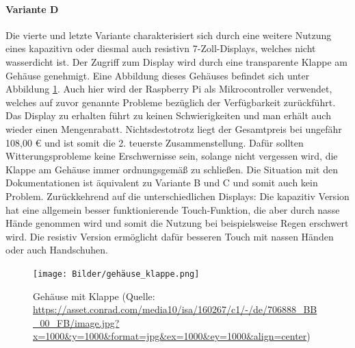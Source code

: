 \paragraph{Variante D}
Die vierte und letzte Variante charakterisiert sich durch eine weitere Nutzung eines \gls{kapazitiv}n oder diesmal auch \gls{resistiv}n 7-Zoll-Displays, welches nicht wasserdicht ist. Der Zugriff zum Display wird durch eine transparente Klappe am Gehäuse genehmigt. Eine Abbildung dieses Gehäuses befindet sich unter Abbildung \ref{fig:gehäuse_mit_klappe}. Auch hier wird der Raspberry Pi als Mikrocontroller verwendet, welches auf zuvor genannte Probleme bezüglich der Verfügbarkeit zurückführt. Das Display zu erhalten führt zu keinen Schwierigkeiten und man erhält auch wieder einen Mengenrabatt. Nichtsdestotrotz liegt der Gesamtpreis bei ungefähr 108,00 € und ist somit die 2. teuerste Zusammenstellung. Dafür sollten Witterungsprobleme keine Erschwernisse sein, solange nicht vergessen wird, die Klappe am Gehäuse immer ordnungsgemäß zu schließen. Die Situation mit den Dokumentationen ist äquivalent zu Variante B und C und somit auch kein Problem. Zurückkehrend auf die unterschiedlichen Displays: Die \gls{kapazitiv} Version hat eine allgemein besser funktionierende Touch-Funktion, die aber durch nasse Hände genommen wird und somit die Nutzung bei beispielsweise Regen erschwert wird. Die \gls{resistiv} Version ermöglicht dafür besseren Touch mit nassen Händen oder auch Handschuhen.
\begin{figure}[ht]
	\centering
	\texttt{[image: Bilder/gehäuse\_klappe.png]}
	\caption{Gehäuse mit Klappe (Quelle: \url{https://asset.conrad.com/media10/isa/160267/c1/-/de/706888_BB_00_FB/image.jpg?x=1000&y=1000&format=jpg&ex=1000&ey=1000&align=center})}
	\label{fig:gehäuse_mit_klappe}
\end{figure}
\newpage
